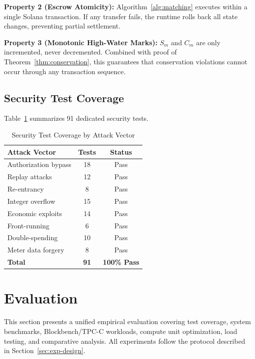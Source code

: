 \documentclass[conference]{IEEEtran}
\begin{document}
\textbf{Property 2 (Escrow Atomicity):} Algorithm~\ref{alg:matching} executes within a single Solana transaction. If any transfer fails, the runtime rolls back all state changes, preventing partial settlement.

\textbf{Property 3 (Monotonic High-Water Marks):} $S_m$ and $C_m$ are only incremented, never decremented. Combined with proof of Theorem~\ref{thm:conservation}, this guarantees that conservation violations cannot occur through any transaction sequence.

\subsection{Security Test Coverage}

Table~\ref{tab:security-tests} summarizes 91 dedicated security tests.

\begin{table}[htbp]
\caption{Security Test Coverage by Attack Vector}
\begin{center}
\small
\begin{tabular}{@{}lcc@{}}
\toprule
\textbf{Attack Vector} & \textbf{Tests} & \textbf{Status} \\
\midrule
Authorization bypass & 18 & Pass \\
Replay attacks & 12 & Pass \\
Re-entrancy & 8 & Pass \\
Integer overflow & 15 & Pass \\
Economic exploits & 14 & Pass \\
Front-running & 6 & Pass \\
Double-spending & 10 & Pass \\
Meter data forgery & 8 & Pass \\
\midrule
\textbf{Total} & \textbf{91} & \textbf{100\% Pass} \\
\bottomrule
\end{tabular}
\label{tab:security-tests}
\end{center}
\end{table}

\section{Evaluation}
\label{sec:evaluation}

This section presents a unified empirical evaluation covering test coverage, system benchmarks, Blockbench/TPC-C workloads, compute unit optimization, load testing, and comparative analysis. All experiments follow the protocol described in Section~\ref{sec:exp-design}.
\end{document}

